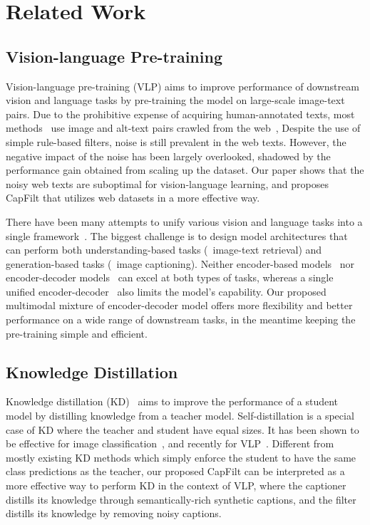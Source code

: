 \vspace{-2.5ex}
\section{Related Work}



\vspace{-0.5ex}
\subsection{Vision-language Pre-training}
\vspace{-0.5ex}
Vision-language pre-training (VLP) aims to improve performance of downstream vision and language tasks
by pre-training the model on large-scale image-text pairs.
Due to the prohibitive expense of acquiring human-annotated texts,
most methods~\cite{uniter,oscar,ALBEF,simvlm,clip} use image and alt-text pairs crawled from the web~\cite{CC,cc12m,align},
Despite the use of simple rule-based filters,
noise is still prevalent in the web texts.
However, the negative impact of the noise has been largely overlooked, shadowed by the performance gain 
obtained from scaling up the dataset.
Our paper shows that the noisy web texts are suboptimal for vision-language learning,
and proposes CapFilt that utilizes web datasets in a more effective way.

There have been many attempts to unify various vision and language tasks into a single framework~\cite{VLP,VL_T5,simvlm}.
The biggest challenge is to design model architectures that can perform both understanding-based tasks (\eg~image-text retrieval) and generation-based tasks (\eg~image captioning).
Neither encoder-based models~\cite{ALBEF,unimo,clip} nor encoder-decoder models~\cite{VL_T5,simvlm} can excel at both types of tasks,
whereas a single unified encoder-decoder~\cite{VLP} also limits the model's capability.
Our proposed multimodal mixture of encoder-decoder model offers more flexibility and better performance on a wide range of downstream tasks,
in the meantime keeping the pre-training simple and efficient.


\vspace{-1ex}
\subsection{Knowledge Distillation}
\vspace{-0.5ex}
Knowledge distillation (KD)~\cite{kd_hinton} aims to improve the performance of a student model by distilling knowledge from a teacher model.
Self-distillation is a special case of KD where the teacher and student have equal sizes.
It has been shown to be effective for image classification~\cite{noisy_student},
and recently for VLP~\cite{ALBEF}.
Different from mostly existing KD methods which simply enforce the student to have the same class predictions as the teacher,
our proposed CapFilt can be interpreted as a more effective way to perform KD in the context of VLP,
where the captioner distills its knowledge through semantically-rich synthetic captions,
and the filter distills its knowledge by removing noisy captions.

